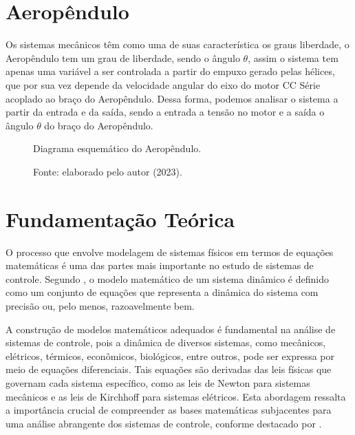 \section{Aeropêndulo}
Os sistemas mecânicos têm como uma de suas característica os graus liberdade, o Aeropêndulo tem um grau de liberdade, sendo o ângulo $\theta$, assim o sistema tem apenas uma variável a ser controlada a partir do empuxo gerado pelas hélices, que por sua vez depende da velocidade angular do eixo do motor CC Série acoplado ao braço do Aeropêndulo. Dessa forma, podemos analisar o sistema a partir da entrada e da saída, sendo a entrada a tensão no motor e a saída o ângulo $\theta$ do braço do Aeropêndulo.

\begin{figure}[!h]
	\centering
	\caption{Diagrama esquemático do Aeropêndulo.}
	\caption*{Fonte: elaborado pelo autor (2023).}
        \label{fig4:image_04}
\end{figure}




\section{ Fundamentação Teórica}
\label{fundamentacao_teorica}

O processo que envolve modelagem de sistemas físicos em termos de equações matemáticas é uma das partes mais importante no estudo de sistemas de controle. Segundo , o modelo matemático de um sistema dinâmico é definido como um conjunto de equações que representa a dinâmica do sistema com precisão ou, pelo menos, razoavelmente bem.

A construção de modelos matemáticos adequados é fundamental na análise de sistemas de controle, pois a dinâmica de diversos sistemas, como mecânicos, elétricos, térmicos, econômicos, biológicos, entre outros, pode ser expressa por meio de equações diferenciais. Tais equações são derivadas das leis físicas que governam cada sistema específico, como as leis de Newton para sistemas mecânicos e as leis de Kirchhoff para sistemas elétricos. Esta abordagem ressalta a importância crucial de compreender as bases matemáticas subjacentes para uma análise abrangente dos sistemas de controle, conforme destacado por .
